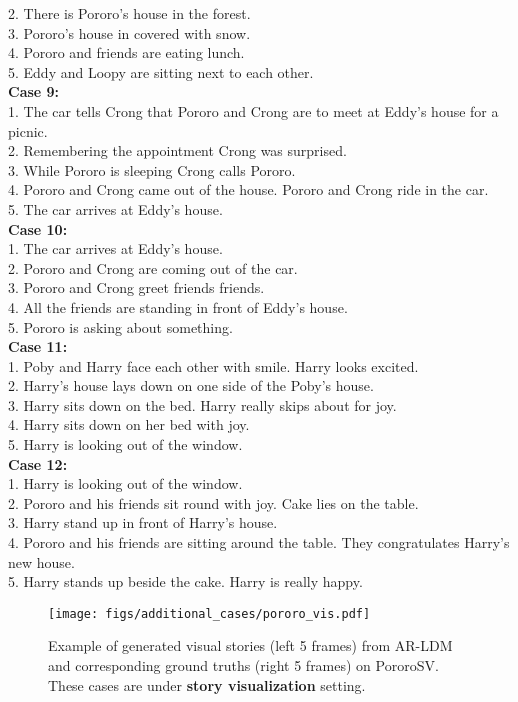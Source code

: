 \documentclass[10pt,twocolumn,letterpaper]{article}
\begin{document}
{{2. There is Pororo's house in the forest.\\
3. Pororo's house in covered with snow.\\
4. Pororo and friends are eating lunch.\\
5. Eddy and Loopy are sitting next to each other.\\
\textbf{Case 9:}\\
1. The car tells Crong that Pororo and Crong are to meet at Eddy's house for a picnic.\\
2. Remembering the appointment Crong was surprised.\\
3. While Pororo is sleeping Crong calls Pororo.\\
4. Pororo and Crong came out of the house. Pororo and Crong ride in the car.\\
5. The car arrives at Eddy's house.\\
\textbf{Case 10:}\\
1. The car arrives at Eddy's house.\\
2. Pororo and Crong are coming out of the car.\\
3. Pororo and Crong greet friends friends.\\
4. All the friends are standing in front of Eddy's house.\\
5. Pororo is asking about something.\\
\textbf{Case 11:}\\
1. Poby and Harry face each other with smile. Harry looks excited.\\
2. Harry's house lays down on one side of the Poby's house.\\
3. Harry sits down on the bed. Harry really skips about for joy.\\
4. Harry sits down on her bed with joy.\\
5. Harry is looking out of the window.\\
\textbf{Case 12:}\\
1. Harry is looking out of the window.\\
2. Pororo and his friends sit round with joy. Cake lies on the table.\\
3. Harry stand up in front of Harry's house.\\
4. Pororo and his friends are sitting around the table. They congratulates Harry's new house.\\
5. Harry stands up beside the cake. Harry is really happy.\\
}}

\begin{figure*}[!th]
\centering
\texttt{[image: figs/additional\_cases/pororo\_vis.pdf]}
\caption{Example of generated visual stories (left 5 frames) from AR-LDM and corresponding ground truths (right 5 frames) on PororoSV. These cases are under \textbf{story visualization} setting.}
\label{fig:additional_pororovis}
\end{figure*}
\end{document}
